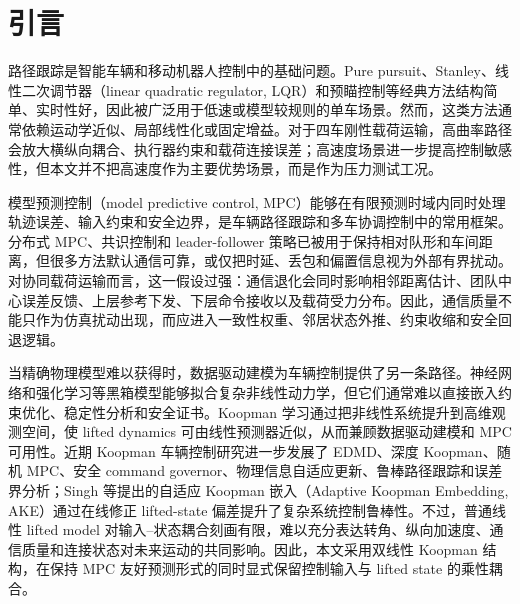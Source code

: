 \documentclass[twocolumn,3p,times,procedia]{elsarticle}
\newif\ifNRReview
\newcommand{\reviewblock}[1]{\ifNRReview\par\smallskip\noindent\begingroup\setlength{\fboxsep}{4pt}\colorbox{yellow!35}{\parbox{0.96\linewidth}{\footnotesize\textbf{当前不足：} #1}}\endgroup\par\smallskip\fi}
\newcommand{\AKE}{AKE-M}
\begin{document}
\reviewblock{回头弯同初始条件面板中，高曲率抗扰分支的团队中心横向 RMSE 降至 0.0851 m、峰值降至 0.1804 m，满足 0.2 m 内的峰值目标；但最终货物保护版本为了降低合力会牺牲部分横向误差，不能写成“全过程严格小于基线”。15 m/s 正弦已由进度过强版本更新为局部平衡版本，可跑完整且横向 RMSE 从 0.1586 m 降至 0.1574 m、纵向 RMSE 从 0.8857 m 降至 0.8815 m；但最大逐点正 gap 仍为 0.0041 m，因此只能写作 RMSE/峰值改善，不能写作全过程严格逐点优于基线。载荷力峰值在若干场景中高于 \AKE{}，因此受力指标仍应作为代价审计项。}


\section{引言}

路径跟踪是智能车辆和移动机器人控制中的基础问题。Pure pursuit、Stanley、线性二次调节器（linear quadratic regulator, LQR）和预瞄控制等经典方法结构简单、实时性好，因此被广泛用于低速或模型较规则的单车场景。然而，这类方法通常依赖运动学近似、局部线性化或固定增益。对于四车刚性载荷运输，高曲率路径会放大横纵向耦合、执行器约束和载荷连接误差；高速度场景进一步提高控制敏感性，但本文并不把高速度作为主要优势场景，而是作为压力测试工况。

模型预测控制（model predictive control, MPC）能够在有限预测时域内同时处理轨迹误差、输入约束和安全边界，是车辆路径跟踪和多车协调控制中的常用框架。分布式 MPC、共识控制和 leader-follower 策略已被用于保持相对队形和车间距离，但很多方法默认通信可靠，或仅把时延、丢包和偏置信息视为外部有界扰动。对协同载荷运输而言，这一假设过强：通信退化会同时影响相邻距离估计、团队中心误差反馈、上层参考下发、下层命令接收以及载荷受力分布。因此，通信质量不能只作为仿真扰动出现，而应进入一致性权重、邻居状态外推、约束收缩和安全回退逻辑。

当精确物理模型难以获得时，数据驱动建模为车辆控制提供了另一条路径。神经网络和强化学习等黑箱模型能够拟合复杂非线性动力学，但它们通常难以直接嵌入约束优化、稳定性分析和安全证书。Koopman 学习通过把非线性系统提升到高维观测空间，使 lifted dynamics 可由线性预测器近似，从而兼顾数据驱动建模和 MPC 可用性\cite{brunton2016koopmanControl,korda2018koopmanMpc,xiao2022deepKoopmanVehicle,joglekar2023koopmanExperimental}。近期 Koopman 车辆控制研究进一步发展了 EDMD、深度 Koopman、随机 MPC、安全 command governor、物理信息自适应更新、鲁棒路径跟踪和误差界分析\cite{kim2025ksmpc,chen2024koopmanSafetyGovernor,wang2026deepKoopmanRobustTracking,zhang2025physicsInformedAdaptiveKoopman,chen2024esoDeepKoopman,philipp2023koopmanErrorBounds,cibulka2021koopmanVehicleMpc}；Singh 等提出的自适应 Koopman 嵌入（Adaptive Koopman Embedding, AKE）通过在线修正 lifted-state 偏差提升了复杂系统控制鲁棒性\cite{singh2025adaptiveKoopman}。不过，普通线性 lifted model 对输入--状态耦合刻画有限，难以充分表达转角、纵向加速度、通信质量和连接状态对未来运动的共同影响。因此，本文采用双线性 Koopman 结构，在保持 MPC 友好预测形式的同时显式保留控制输入与 lifted state 的乘性耦合。
\end{document}
